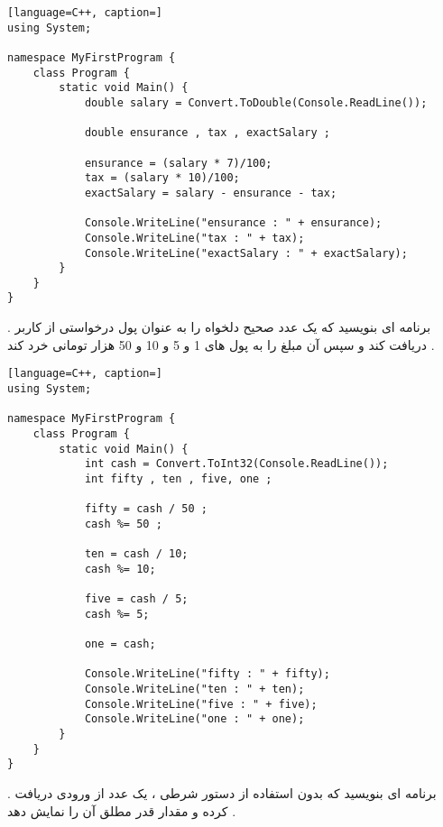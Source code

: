\documentclass[12pt]{article}
\begin{document}
\begin{latin}
\begin{lstlisting}[language=C++, caption=]
using System;

namespace MyFirstProgram {
	class Program {
		static void Main() {
			double salary = Convert.ToDouble(Console.ReadLine());

			double ensurance , tax , exactSalary ;
			
			ensurance = (salary * 7)/100;
			tax = (salary * 10)/100;
			exactSalary = salary - ensurance - tax;
			
			Console.WriteLine("ensurance : " + ensurance);
			Console.WriteLine("tax : " + tax);
			Console.WriteLine("exactSalary : " + exactSalary);
		}
	}
}
\end{lstlisting}
\end{latin}







\newpage

 . برنامه ای بنویسید که
 یک عدد صحیح دلخواه را به عنوان پول درخواستی از کاربر دریافت کند و سپس آن مبلغ را به پول های 1 و 5 و 10 و 50 هزار تومانی خرد کند .
 
 
 
 \begin{latin}
\begin{lstlisting}[language=C++, caption=]
using System;

namespace MyFirstProgram {
	class Program {
		static void Main() {
			int cash = Convert.ToInt32(Console.ReadLine());
			int fifty , ten , five, one ;
			
			fifty = cash / 50 ;
			cash %= 50 ;
			
			ten = cash / 10;
			cash %= 10;
			
			five = cash / 5;
			cash %= 5;
			
			one = cash;
			
			Console.WriteLine("fifty : " + fifty);
			Console.WriteLine("ten : " + ten);
			Console.WriteLine("five : " + five);
			Console.WriteLine("one : " + one);
		}
	}
}
\end{lstlisting}
\end{latin}
 
 
 
 
 
 
 \newpage
 
  . برنامه ای بنویسید که بدون استفاده از دستور شرطی 
،
یک عدد از ورودی دریافت کرده و مقدار قدر مطلق آن را نمایش دهد .
\end{document}
